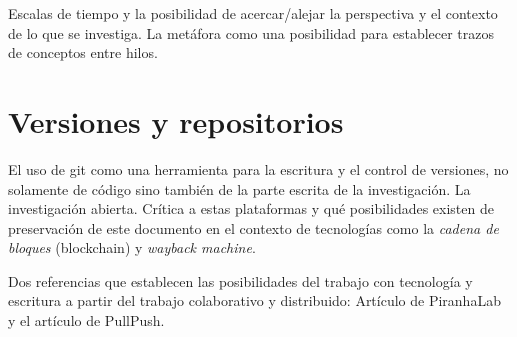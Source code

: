 Escalas de tiempo y la posibilidad de acercar/alejar la perspectiva y el contexto de lo que se investiga. La metáfora como una posibilidad para establecer trazos de conceptos entre hilos. 



\section{Versiones y repositorios}

El uso de \gls{git} como una herramienta para la escritura y el control de versiones, no solamente de código sino también de la parte escrita de la investigación. La investigación abierta. Crítica a estas plataformas y qué posibilidades existen de preservación de este documento en el contexto de tecnologías como la \emph{cadena de bloques} (blockchain) y \emph{wayback machine}. 

Dos referencias que establecen las posibilidades del trabajo con tecnología y escritura a partir del trabajo colaborativo y distribuido: Artículo de PiranhaLab y el artículo de PullPush. 

